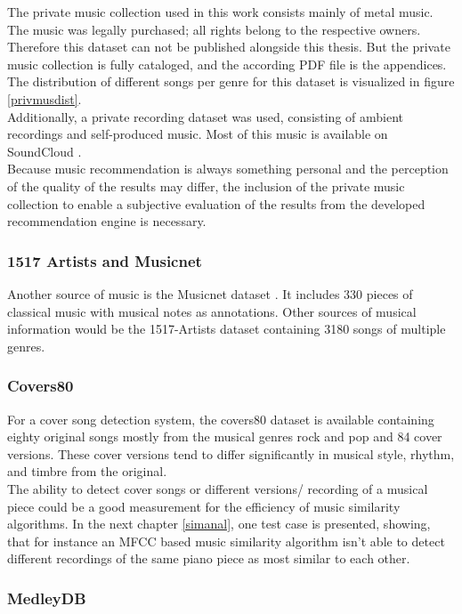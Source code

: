 The private music collection used in this work consists mainly of metal music. The music was legally purchased; all rights belong to the respective owners. Therefore this dataset can not be published alongside this thesis. But the private music collection is fully cataloged, and the according PDF file is the appendices.
The distribution of different songs per genre for this dataset is visualized in figure \ref{privmusdist}.\\
\noindent Additionally, a private recording dataset was used, consisting of ambient recordings and self-produced music. Most of this music is available on SoundCloud \cite{bqpd1}.\\
Because music recommendation is always something personal and the perception of the quality of the results may differ, the inclusion of the private music collection to enable a subjective evaluation of the results from the developed recommendation engine is necessary.


\subsubsection{1517 Artists and Musicnet}

Another source of music is the Musicnet dataset \cite{musicnet1}. It includes 330 pieces of classical music with musical notes as annotations. Other sources of musical information would be the 1517-Artists dataset containing 3180 songs of multiple genres. \cite{1517artists1}

\subsubsection{Covers80}\label{cov801}

For a cover song detection system, the covers80 dataset is available \cite{cover80} containing eighty original songs mostly from the musical genres rock and pop and 84 cover versions. These cover versions tend to differ significantly in musical style, rhythm, and timbre from the original.\\
The ability to detect cover songs or different versions/ recording of a musical piece could be a good measurement for the efficiency of music similarity algorithms. In the next chapter \ref{simanal}, one test case is presented, showing, that for instance an MFCC based music similarity algorithm isn't able to detect different recordings of the same piano piece as most similar to each other. 

\subsubsection{MedleyDB}

